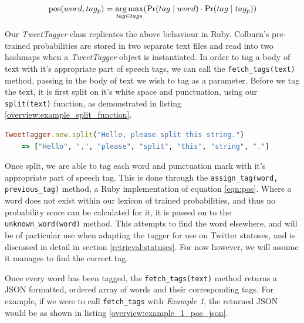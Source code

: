 \begin{equation}
	\label{eqn:pos}
	\operatorname*{pos}(word,tag_{p}) = \operatorname*{arg\,max}_{tag \in tags} (\Pr(tag \mid word) \cdot \Pr(tag \mid tag_{p}))
\end{equation}

Our \emph{TweetTagger} class replicates the above behaviour in Ruby. Colburn's pre-trained probabilities are stored in two separate text files and read into two hashmaps when a \emph{TweetTagger} object is instantiated. In order to tag a body of text with it's appropriate part of speech tags, we can call the \texttt{fetch\_tags(text)} method, passing in the body of text we wish to tag as a parameter. Before we tag the text, it is first split on it's white space and punctuation, using our \texttt{split(text)} function, as demonstrated in listing \ref{overview:example_split_function}.

\begin{lstlisting}[language=Ruby, numbers=none, caption={Example use of split function}, label=overview:example_split_function]
TweetTagger.new.split("Hello, please split this string.")
	=> ["Hello", ",", "please", "split", "this", "string", "."]
\end{lstlisting}

Once split, we are able to tag each word and punctuation mark with it's appropriate part of speech tag. This is done through the \texttt{assign\_tag\-(word\-, \-previous\_tag)} method, a Ruby implementation of equation \ref{eqn:pos}. Where a word does not exist within our lexicon of trained probabilities, and thus no probability score can be calculated for it, it is passed on to the \texttt{unknown\_word\-(word)} method. This attempts to find the word elsewhere, and will be of particular use when adapting the tagger for use on Twitter statuses, and is discussed in detail in section \ref{retrieval:statuses}. For now however, we will assume it manages to find the correct tag.

Once every word has been tagged, the \texttt{fetch\_tags(text)} method returns a JSON formatted, ordered array of words and their corresponding tags. For example, if we were to call \texttt{fetch\_tags} with \emph{Example 1}, the returned JSON would be as shown in listing \ref{overview:example_1_pos_json}.

